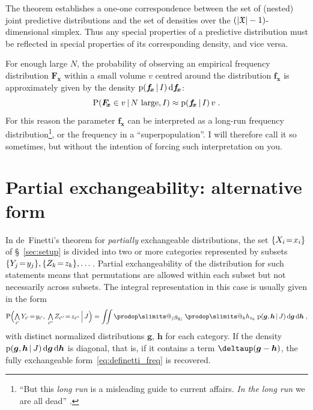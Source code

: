 \documentclass[\ifafour a4paper,12pt,\else a5paper,10pt,\fi%
onecolumn,oneside,article,%
british%
]{memoir}
\makeatletter
\theoremstyle{remark}
\theoremstyle{innote}
\def\prod{\DOTSI\prodop\slimits@}
\newcommand*{\delt}{\deltaup}%
\newcommand*{\di}{\mathrm{d}}%
\newcommand*{\Land}{\mathop{\textstyle\bigwedge}}
\DeclarePairedDelimiter\abs{\lvert}{\rvert}
\DeclarePairedDelimiter\set{\{}{\}}
\newcommand*{\pf}{\mathrm{p}}%
\newcommand*{\p}{\mathrm{P}}%
\renewcommand*{\|}[1][]{\nonscript\,#1\vert\nonscript\,\mathopen{}}
\newcommand*{\sect}{\S}%
\renewcommand*{\=}{\TextOrMath\texteq\eq}
\newcommand*{\X}[1]{X_{#1}}
\newcommand*{\x}[1]{x_{#1}}
\newcommand*{\Y}[1]{Y_{#1}}
\newcommand*{\y}[1]{y_{#1}}
\newcommand*{\Z}[1]{Z_{#1}}
\newcommand*{\z}[1]{z_{#1}}
\newcommand*{\sx}{\mathfrak{X}}
\newcommand*{\vf}{v}
\newcommand*{\fx}{\bm{f_{\!x}}}
\newcommand*{\Fx}{\bm{F_{\!x}}}
\newcommand*{\bg}{\bm{g}}
\newcommand*{\bh}{\bm{h}}
\newcommand*{\zI}{J}
\makeatother
\begin{document}
The theorem establishes a one-one correspondence between the set of
(nested) joint predictive distributions and the set of densities over the
$(\abs{\sx}-1)$-dimensional simplex. Thus any special properties of a
predictive distribution must be reflected in special properties of its
corresponding density, and vice versa.

For enough large $N$, the probability of observing an empirical frequency
distribution $\Fx$ within a small volume $\vf$ centred around the
distribution $\fx$ is approximately given by the density
$\pf(\fx \| I)\,\di\fx$:
\begin{equation}
  \label{eq:longrun_freq}
  \p( \Fx \in v \| \text{$N$ large}, I)
  \approx \pf(\fx \| I)\,v \;.
\end{equation}
For this reason the parameter $\fx$ can be interpreted as a long-run
frequency distribution\footnote{\enquote{But this \emph{long run} is a
    misleading guide to current affairs. \emph{In the long run} we are all
    dead} \parencite[\sect~3.I p.~65]{keynes1923_r2013}.}, or the frequency
in a \enquote{superpopulation}. I will therefore call it so sometimes, but
without the intention of forcing such interpretation on you.


\section{Partial exchangeability: alternative form}
\label{sec:partial_exch}

In de~Finetti's theorem for \emph{partially} exchangeable distributions,
the set $\set{\X{i}\=\x{i}}$ of \sect~\ref{sec:setup} is divided into two
or more categories represented by subsets
$\set{\Y{j}\=\y{j}}, \set{\Z{k}\=\z{k}}, \dotsc$. Partial exchangeability
of the distribution for such statements means that permutations are allowed
within each subset but not necessarily across subsets. The integral
representation in this case %
is usually given in the form
\begin{equation}
  \label{eq:partialdefinetti}
  \p\Bigl( \Land_{i'}\Y{i'}\=\y{i'},\;
  \Land_{i''}\Z{i''}\=\z{i''} \|[\Big] \zI\Bigr) =
  \iint
  \prod_{j} g_{\y{j}}\;
  \prod_{k} h_{\z{k}}\;
  \pf(\bg,\bh \| \zI)\,\di\bg\,\di\bh \;,
\end{equation}
with distinct normalized distributions $\bg$, $\bh$ for each category. If
the density $\pf(\bg,\bh \| \zI)\,\di\bg\,\di\bh$ is diagonal, that is, if
it contains a term $\delt(\bg-\bh)$, the fully exchangeable
form~\eqref{eq:definetti_freq} is recovered.
\end{document}
